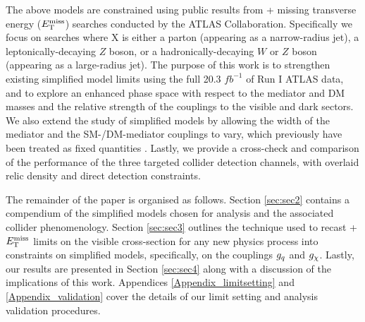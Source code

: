 The above models are constrained using public results from \monoX + missing transverse energy ($E_{\mathrm{T}}^{\mathrm{miss}}$) searches conducted by the ATLAS Collaboration. Specifically we focus on searches where X is either a parton (appearing as a narrow-radius jet), a leptonically-decaying $Z$ boson, or a hadronically-decaying $W$ or $Z$ boson (appearing as a large-radius jet). The purpose of this work is to strengthen existing simplified model limits \cite{} using the full 20.3 $fb^{-1}$ of Run I ATLAS data, and to explore an enhanced phase space with respect to the mediator and DM masses and the relative strength of the couplings to the visible and dark sectors. 
We also extend the study of simplified models by allowing the width of the mediator and the SM-/DM-mediator couplings to vary, which previously have been treated as fixed quantities \cite{}. Lastly, we provide a cross-check and comparison of the performance of the three targeted collider detection channels, with overlaid relic density and direct detection constraints.

The remainder of the paper is organised as follows. Section \ref{sec:sec2} contains a compendium of the simplified models chosen for analysis and the associated collider phenomenology. Section \ref{sec:sec3} outlines the technique used to recast \monoX + $E_{\mathrm{T}}^{\mathrm{miss}}$ limits on the visible cross-section for any new physics process into constraints on simplified models, specifically, on the couplings $g_q$ and $g_{\chi}$. Lastly, our results are presented in Section \ref{sec:sec4} along with a discussion of the implications of this work. Appendices \ref{Appendix_limitsetting} and \ref{Appendix_validation} cover the details of our limit setting and analysis validation procedures.

